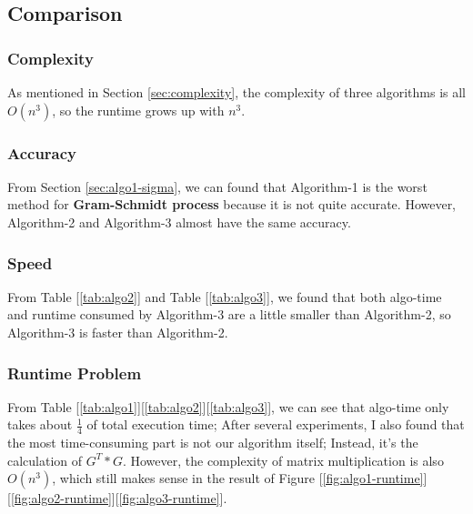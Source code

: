\documentclass{article}
\begin{document}
\subsection{Comparison}
\subsubsection{Complexity}
As mentioned in Section \ref{sec:complexity}, the complexity of three algorithms is all {\boldmath$O(n^3)$}, so the runtime grows 
up with $n^3$.
\subsubsection{Accuracy}
From Section \ref{sec:algo1-sigma}, we can found that Algorithm-1 is the worst method for \textbf{Gram-Schmidt process} because it is not
quite accurate. However, Algorithm-2 and Algorithm-3 almost have the same accuracy.
\subsubsection{Speed}
From Table [\ref{tab:algo2}] and Table [\ref{tab:algo3}], we found that both algo-time and runtime consumed by Algorithm-3 are a little
smaller than Algorithm-2, so Algorithm-3 is faster than Algorithm-2.
\subsubsection{Runtime Problem}
From Table [\ref{tab:algo1}][\ref{tab:algo2}][\ref{tab:algo3}], we can see that algo-time only takes about $\frac{1}{4}$ of total
execution time; After several experiments, I also found that the most time-consuming part is not our algorithm itself; Instead,
it's the calculation of $G^T * G$. However, the complexity of matrix multiplication is also $O(n^3)$, which still makes sense in 
the result of Figure [\ref{fig:algo1-runtime}][\ref{fig:algo2-runtime}][\ref{fig:algo3-runtime}].

\end{document}
